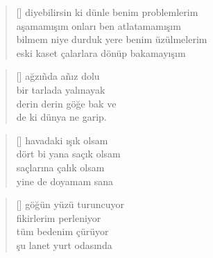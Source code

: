 \documentclass[10pt, openright, twoside]{memoir}
\theoremstyle{definition}
\begin{document}
%
\newpage
{}
\vspace*{\fill}
\settowidth{\versewidth}{bilmem niye durduk yere benim üzülmelerim}
\begin{verse}[\versewidth]
  diyebilirsin ki dünle benim problemlerim \\
  aşamamışım onları ben atlatamamışım \\
  bilmem niye durduk yere benim üzülmelerim \\
  eski kaset çalarlara dönüp bakamayışım
\end{verse}
\vspace*{\fill}
%
\newpage
{}
\vspace*{\fill}
\settowidth{\versewidth}{derin derin göğe bak ve}
\begin{verse}[\versewidth]
  ağzı\~nda a\~nız dolu  \\
  bir tarlada yalınayak  \\
  derin derin göğe bak ve \\
  de ki dünya ne garip.
\end{verse}
\vspace*{\fill}
%
\newpage
{}
\vspace*{\fill}
\settowidth{\versewidth}{dört bi yana saçık olsam}
\begin{verse}[\versewidth]
  havadaki ışık olsam \\
  dört bi yana saçık olsam \\
  saçlarına çalık olsam \\
  yine de doyamam sana
\end{verse}
\vspace*{\fill}
%
\newpage
{}
\vspace*{\fill}
\settowidth{\versewidth}{şu lanet yurt odasında}
\begin{verse}[\versewidth]
  göğün yüzü turuncuyor \\
  fikirlerim perleniyor \\
  tüm bedenim çürüyor \\
  şu lanet yurt odasında
\end{verse}
\vspace*{\fill}
%
\newpage
{}
\vspace*{\fill}
\settowidth{\versewidth}{bırakıp beynimi fikir sellerine}
\end{document}
